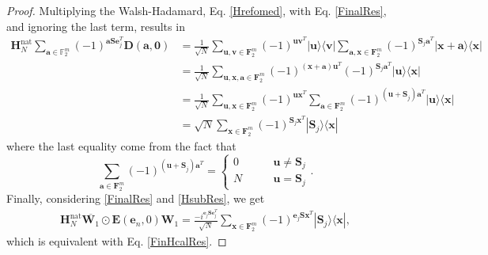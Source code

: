 \documentclass[lettersize,journal,onecolumn]{IEEEtran}
\begin{document}
\begin{proof}
\noindent Multiplying the Walsh-Hadamard, Eq. \eqref{Hrefomed}, with Eq. \eqref{FinalRes}, and ignoring the last term, results in
\begin{align}
	\mathbf{H}_N^{\text{nat}} \sum_{\mathbf{a} \in \mathbb{F}^m_2}{(-1)^{\mathbf{a S }\mathbf{e}_j^T} \mathbf{D(a,0)}} &= \frac{1}{\sqrt{N}} \sum_{\mathbf{u}, \mathbf{v} \in \mathbf{F}_2^m}{\left(-1\right)^{\mathbf{u} \mathbf{v}^T } |\mathbf{u} \rangle  \langle \mathbf{v}|} \sum_{\mathbf{a}, \mathbf{x} \in \mathbf{F}_2^m}{\left(-1\right)^{\mathbf{S}_j \mathbf{a}^T } |\mathbf{x+a} \rangle  \langle \mathbf{x}|} \nonumber \\
	& =\frac{1}{\sqrt{N}} \sum_{\mathbf{u}, \mathbf{x}, \mathbf{a} \in \mathbf{F}_2^m}{(-1)^{(\mathbf{x+a})\mathbf{u}^T} (-1)^{\mathbf{S}_j \mathbf{a}^T}|\mathbf{u} \rangle  \langle \mathbf{x}| } \nonumber \\ 
	&=\frac{1}{\sqrt{N}} \sum_{\mathbf{u}, \mathbf{x} \in \mathbf{F}_2^m}{(-1)^{\mathbf{u} \mathbf{x}^T} \sum_{ \mathbf{a} \in \mathbf{F}_2^m}{(-1)^{(\mathbf{u+S}_j)\mathbf{a}^T}} |\mathbf{u} \rangle  \langle \mathbf{x}| }  \nonumber \\
	&=\sqrt{N} \sum_{ \mathbf{x} \in \mathbf{F}_2^m}{(-1)^{\mathbf{S}_j \mathbf{x}^T} |\mathbf{S}_j \rangle  \langle \mathbf{x}|} \label{HsubRes}
\end{align}
where the last equality come from the fact that 
\begin{equation}
	\sum_{ \mathbf{a} \in \mathbf{F}_2^m}{(-1)^{(\mathbf{u+S}_j)\mathbf{a}^T}} = 
	\begin{cases}
		0 & \qquad \mathbf{u} \neq \mathbf{S}_j \\
		N & \qquad \mathbf{u} = \mathbf{S}_j
	\end{cases}.
\end{equation}
Finally, considering \eqref{FinalRes} and \eqref{HsubRes}, we get
\begin{align}
	\mathbf{H}_N^{\text{nat}}\overline{\mathbf{W}_1} \odot \mathbf{E}(\mathbf{e}_n, 0)\mathbf{W}_1 = \frac{-i^{\mathbf{e}_j \mathbf{S e}_j^T}}{\sqrt{N}} \sum_{ \mathbf{x} \in \mathbf{F}_2^m}{(-1)^{\mathbf{e}_j \mathbf{S} \mathbf{x}^T} |\mathbf{S}_j \rangle  \langle \mathbf{x}| },
\end{align}
which is equivalent with Eq. \eqref{FinHcalRes}.


\end{proof}
\end{document}
